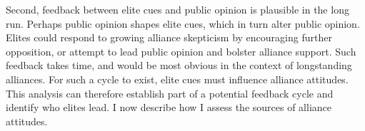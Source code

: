 \documentclass[12pt]{article}
\begin{document}
%
%
%
%
%



Second, feedback between elite cues and public opinion is plausible in the long run. 
Perhaps public opinion shapes elite cues, which in turn alter public opinion. 
Elites could respond to growing alliance skepticism by encouraging further opposition, or attempt to lead public opinion and bolster alliance support.
Such feedback takes time, and would be most obvious in the context of longstanding alliances.
For such a cycle to exist, elite cues must influence alliance attitudes.
This analysis can therefore establish part of a potential feedback cycle and identify who elites lead.  
I now describe how I assess the sources of alliance attitudes. 
\end{document}
